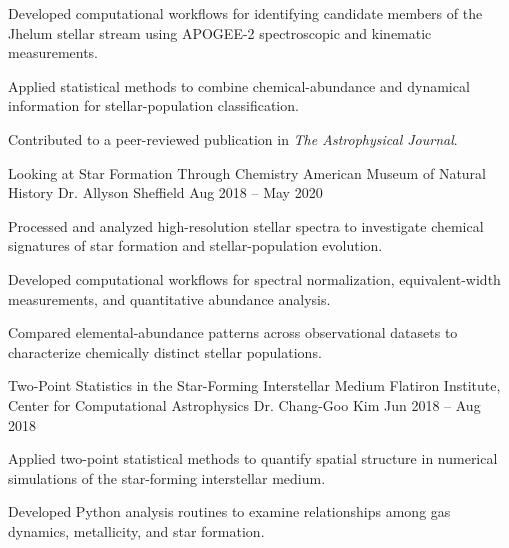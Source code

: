 \begin{researchitems}
  \item Developed computational workflows for identifying candidate members of the Jhelum stellar stream using APOGEE-2 spectroscopic and kinematic measurements.

  \item Applied statistical methods to combine chemical-abundance and dynamical information for stellar-population classification.

  \item Contributed to a peer-reviewed publication in \textit{The Astrophysical Journal}.
\end{researchitems}

\vspace{0.4em}

\researchentry
  {Looking at Star Formation Through Chemistry}
  {American Museum of Natural History}
  {Dr. Allyson Sheffield}
  {Aug 2018 -- May 2020}

\begin{researchitems}
  \item Processed and analyzed high-resolution stellar spectra to investigate chemical signatures of star formation and stellar-population evolution.

  \item Developed computational workflows for spectral normalization, equivalent-width measurements, and quantitative abundance analysis.

  \item Compared elemental-abundance patterns across observational datasets to characterize chemically distinct stellar populations.
\end{researchitems}

\vspace{0.4em}

\researchentry
  {Two-Point Statistics in the Star-Forming Interstellar Medium}
  {Flatiron Institute, Center for Computational Astrophysics}
  {Dr. Chang-Goo Kim}
  {Jun 2018 -- Aug 2018}

\begin{researchitems}
  \item Applied two-point statistical methods to quantify spatial structure in numerical simulations of the star-forming interstellar medium.

  \item Developed Python analysis routines to examine relationships among gas dynamics, metallicity, and star formation.
\end{researchitems}

